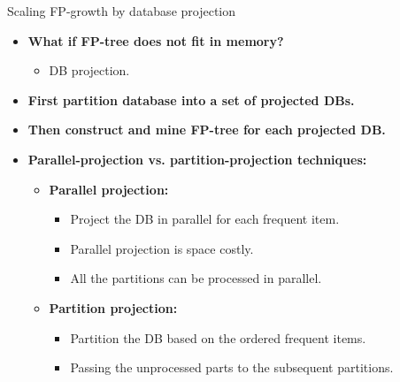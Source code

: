 \documentclass[aspectratio=169,t,xcolor=dvipsnames]{beamer}
\begin{document}
  {
    \begin{frame}{Scaling FP-growth by database projection}
    \centering
    \begin{itemize}
      \item \textbf{What if FP-tree does not fit in memory?}
      \begin{itemize}
        \item DB projection.
      \end{itemize}
      \item \textbf{First partition database into a set of projected DBs.}
      \item \textbf{Then construct and mine FP-tree for each projected DB.}
      \item \textbf{Parallel-projection vs. partition-projection techniques:}
      \begin{itemize}
        \item \textbf{\color{airforceblue}Parallel projection:}
        \begin{itemize}
          \item Project the DB in parallel for each frequent item.
          \item Parallel projection is space costly.
          \item All the partitions can be processed in parallel.
        \end{itemize}
        \item \textbf{\color{airforceblue}Partition projection:}
        \begin{itemize}
          \item Partition the DB based on the ordered frequent items.
          \item Passing the unprocessed parts to the subsequent partitions.
        \end{itemize}
      \end{itemize}
    \end{itemize}
    \end{frame}
  }
\end{document}
